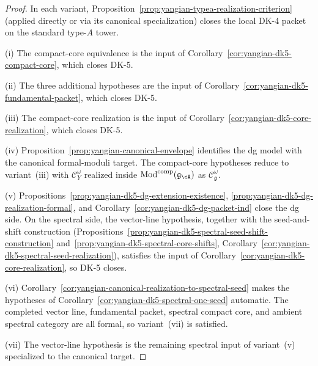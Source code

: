 \begin{proof}
In each variant, Proposition~\ref{prop:yangian-typea-realization-criterion}
(applied directly or via its canonical specialization) closes the local
DK-4 packet on the standard type-$A$ tower.

\textup{(i)}
The compact-core equivalence is the input of
Corollary~\ref{cor:yangian-dk5-compact-core}, which closes DK-5.

\textup{(ii)}
The three additional hypotheses are the input of
Corollary~\ref{cor:yangian-dk5-fundamental-packet}, which closes DK-5.

\textup{(iii)}
The compact-core realization is the input of
Corollary~\ref{cor:yangian-dk5-core-realization}, which closes DK-5.

\textup{(iv)}
Proposition~\ref{prop:yangian-canonical-envelope} identifies the dg
model with the canonical formal-moduli target. The compact-core
hypotheses reduce to variant~\textup{(iii)} with
$\mathcal{C}_Y^\omega$ realized inside
$\operatorname{Mod}^{\mathrm{comp}}(\mathfrak{g}_{\cA})$ as
$\mathcal{C}_{\mathfrak g}^\omega$.

\textup{(v)}
Propositions~\ref{prop:yangian-dk5-dg-extension-existence},
\ref{prop:yangian-dk5-dg-realization-formal}, and
Corollary~\ref{cor:yangian-dk5-dg-packet-ind} close the dg side.
On the spectral side, the vector-line hypothesis, together with
the seed-and-shift construction
(Propositions~\ref{prop:yangian-dk5-spectral-seed-shift-construction}
and~\ref{prop:yangian-dk5-spectral-core-shifts},
Corollary~\ref{cor:yangian-dk5-spectral-seed-realization}), satisfies
the input of Corollary~\ref{cor:yangian-dk5-core-realization}, so
DK-5 closes.

\textup{(vi)}
Corollary~\ref{cor:yangian-canonical-realization-to-spectral-seed}
makes the hypotheses of
Corollary~\ref{cor:yangian-dk5-spectral-one-seed} automatic. The
completed vector line, fundamental packet, spectral compact core, and
ambient spectral category are all formal, so
variant~\textup{(vii)} is satisfied.

\textup{(vii)}
The vector-line hypothesis is the remaining spectral input of
variant~\textup{(v)} specialized to the canonical target.
\end{proof}

